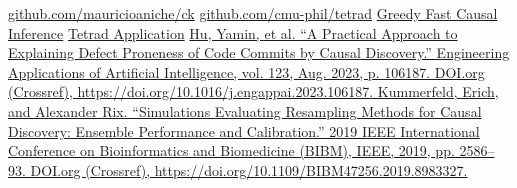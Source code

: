 \documentclass[sigconf,review,anonymous,nonacm=true]{acmart}
\begin{document}
\begin{thebibliography}{99}
    \href{https://github.com/mauricioaniche/ck}{github.com/mauricioaniche/ck}
    \href{https://github.com/cmu-phil/tetrad}{github.com/cmu-phil/tetrad}
    \href{https://www.ccd.pitt.edu/pdfs/GFCId.pdf}{Greedy Fast Causal Inference}
    \href{https://sites.google.com/view/tetradcausal}{Tetrad Application}
    \href{https://www.sciencedirect.com/science/article/pii/S0952197623003718?ref=pdf_download&fr=RR-2&rr=82f90d08eb60b111}{Hu, Yamin, et al. “A Practical Approach to Explaining Defect Proneness of Code Commits by Causal Discovery.” Engineering Applications of Artificial Intelligence, vol. 123, Aug. 2023, p. 106187. DOI.org (Crossref), https://doi.org/10.1016/j.engappai.2023.106187.
    \href{https://ieeexplore.ieee.org/stamp/stamp.jsp?tp=&arnumber=8983327}{Kummerfeld, Erich, and Alexander Rix. “Simulations Evaluating Resampling Methods for Causal Discovery: Ensemble Performance and Calibration.” 2019 IEEE International Conference on Bioinformatics and Biomedicine (BIBM), IEEE, 2019, pp. 2586–93. DOI.org (Crossref), https://doi.org/10.1109/BIBM47256.2019.8983327.
}
}
\end{thebibliography}


% 
% 
\end{document}
